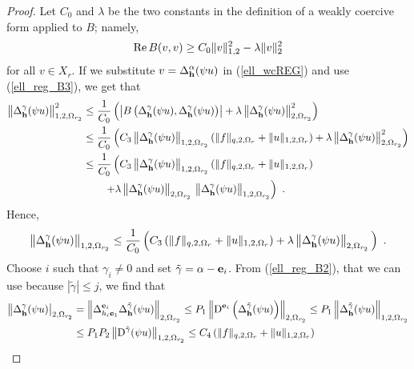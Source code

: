 \begin{proof}
 Let $C_0$ and $\lambda$ be the two constants in the
definition of a weakly coercive form applied to $B$; namely,
\begin{equation} \label{ell_wcREG}
\operatorname{Re} B(v,v) \geq C_0 \|v\|_{1,2}^2 - \lambda \|v\|_2^2
\end{equation}
for all $v \in X_r$.  If we substitute
$\displaystyle v = \Delta^\alpha_{\mathbf{h}} (\psi u)$ in
(\ref{ell_wcREG}) and use (\ref{ell_reg_B3}), we get that
\begin{align*}
\left\| \Delta^\gamma_{\mathbf{h}} (\psi u) \right\|_{1,2,\Omega_{r_2}}^2
&\leq \frac{1}{C_0} \left( \left| B\left(\Delta^\gamma_{\mathbf{h}} (\psi u),
\Delta^\gamma_{\mathbf{h}} (\psi u)\right)\right| + \lambda
\left\|\Delta^\gamma_{\mathbf{h}} (\psi u)\right\|_{2,\Omega_{r_2}}^2 \right)\\
&\leq \frac{1}{C_0} \left(
C_3 \left\|\Delta^\gamma_{\mathbf{h}} (\psi u)\right\|_{1,2,\Omega_{r_2}}
\left( \|f\|_{q,2,\Omega_r} + \|u\|_{1,2,\Omega_r}\right) + \lambda
\left\|\Delta^\gamma_{\mathbf{h}} (\psi u)\right\|_{2,\Omega_{r_2}}^2 \right) \\
&\leq \frac{1}{C_0} \left(
C_3 \left\|\Delta^\gamma_{\mathbf{h}} (\psi u)\right\|_{1,2,\Omega_{r_2}}
\left( \|f\|_{q,2,\Omega_r} + \|u\|_{1,2,\Omega_r}\right) \right. \\
&\qquad \left. + \lambda
\left\|\Delta^\gamma_{\mathbf{h}} (\psi u)\right\|_{2,\Omega_{r_2}}\,
\left\|\Delta^\gamma_{\mathbf{h}} (\psi u)\right\|_{1,2,\Omega_{r_2}} \right) \ .
\end{align*}
Hence,
\[
\left\| \Delta^\gamma_{\mathbf{h}} (\psi u) \right\|_{1,2,\Omega_{r_2}}
\leq \frac{1}{C_0} \left(
C_3 \left( \|f\|_{q,2,\Omega_r} + \|u\|_{1,2,\Omega_r}\right) + \lambda
\left\|\Delta^\gamma_{\mathbf{h}} (\psi u)\right\|_{2,\Omega_{r_2}}\,
\right) \ .
\]
Choose $i$ such that $\gamma_i \neq 0$ and set
$\tilde{\gamma} = \alpha - \mathbf{e}_i$.
From (\ref{ell_reg_B2}), that we can use because $|\tilde{\gamma}|\leq j$,
we find that
\begin{align*}
\left\| \Delta^\gamma_{\VEC{h}} (\psi u) \right|_{2,\Omega_{r_2}}
&= \left\| \Delta_{h_i\VEC{e}_1}^{\VEC{e}_i} \Delta^{\tilde{\gamma}}_{\VEC{h}}
(\psi u) \right\|_{2,\Omega_{r_2}}
\leq P_1 \left\| \diff^{\VEC{e}_i} \left( \Delta^{\tilde{\gamma}}_{\VEC{h}}
(\psi u) \right) \right\|_{2,\Omega_{r_2}}
\leq P_1 \left\| \Delta^{\tilde{\gamma}}_{\VEC{h}}
(\psi u) \right\|_{1,2,\Omega_{r_2}} \\
&\leq P_1 P_2 \left\| \diff^{\tilde{\gamma}} (\psi u) \right\|_{1,2,\Omega_{r_2}}
\leq C_4 \left( \|f\|_{q,2,\Omega_r} + \|u\|_{1,2,\Omega_r} \right)

\end{align*}
\end{proof}
